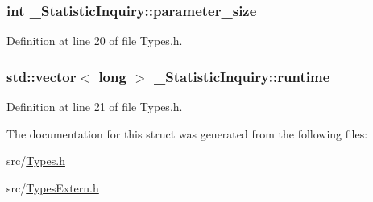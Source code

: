\subsubsection[{parameter\+\_\+size}]{\setlength{\rightskip}{0pt plus 5cm}int \+\_\+\+Statistic\+Inquiry\+::parameter\+\_\+size}\label{struct___statistic_inquiry_a3934f5fbc4dfd91f51203ce53648a9e1}


Definition at line 20 of file Types.\+h.

\hypertarget{struct___statistic_inquiry_a90d5c25e5f7b26fd17e95d06c51a8758}{}
\subsubsection[{runtime}]{\setlength{\rightskip}{0pt plus 5cm}std\+::vector$<$ long $>$ \+\_\+\+Statistic\+Inquiry\+::runtime}\label{struct___statistic_inquiry_a90d5c25e5f7b26fd17e95d06c51a8758}


Definition at line 21 of file Types.\+h.



The documentation for this struct was generated from the following files\+:\begin{DoxyCompactItemize}
\item 
src/\hyperlink{_types_8h}{Types.\+h}\item 
src/\hyperlink{_types_extern_8h}{Types\+Extern.\+h}\end{DoxyCompactItemize}

